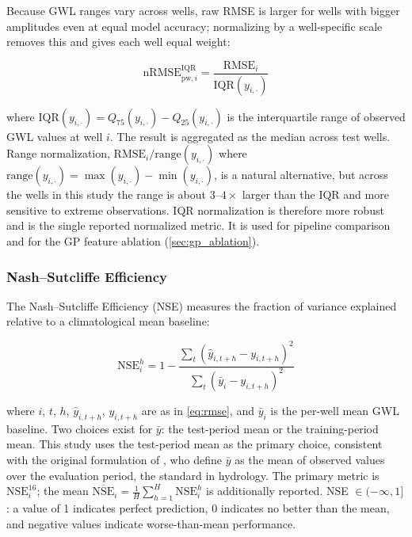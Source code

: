 Because GWL ranges vary across wells, raw RMSE is larger for wells with bigger amplitudes even at equal model accuracy; normalizing by a well-specific scale removes this and gives each well equal weight:

\begin{equation}
  \text{nRMSE}^\text{IQR}_{\text{pw},i} = \frac{\text{RMSE}_i}{\text{IQR}(y_{i,\cdot})}
  \label{eq:nrmse_iqr}
\end{equation}

where $\text{IQR}(y_{i,\cdot}) = Q_{75}(y_{i,\cdot}) - Q_{25}(y_{i,\cdot})$ is the interquartile range of observed GWL values at well $i$. The result is aggregated as the median across test wells. Range normalization, $\text{RMSE}_i / \text{range}(y_{i,\cdot})$ where $\text{range}(y_{i,\cdot}) = \max(y_{i,\cdot}) - \min(y_{i,\cdot})$, is a natural alternative, but across the wells in this study the range is about $3$--$4\times$ larger than the IQR and more sensitive to extreme observations. IQR normalization is therefore more robust and is the single reported normalized metric. It is used for pipeline comparison and for the GP feature ablation (\cref{sec:gp_ablation}).

\subsubsection{Nash--Sutcliffe Efficiency}

The Nash--Sutcliffe Efficiency (NSE) \citep{nash1970river} measures the fraction of variance
explained relative to a climatological mean baseline:

\begin{equation}
  \text{NSE}_i^h = 1 - \frac{\sum_t (\hat{y}_{i,t+h} - y_{i,t+h})^2}{\sum_t (\bar{y}_i - y_{i,t+h})^2}
  \label{eq:nse}
\end{equation}

where $i$, $t$, $h$, $\hat{y}_{i,t+h}$, $y_{i,t+h}$ are as in \cref{eq:rmse}, and $\bar{y}_i$ is the per-well mean GWL baseline. Two choices exist
for $\bar{y}$: the test-period mean or the training-period mean.
This study uses the test-period mean as the primary choice, consistent with the original
formulation of \citet{nash1970river}, who define $\bar{y}$ as the mean of observed values
over the evaluation period, the standard in hydrology.
The primary metric is $\text{NSE}_i^{16}$; the mean $\overline{\text{NSE}}_i = \frac{1}{H}\sum_{h=1}^{H} \text{NSE}_i^h$ is additionally reported. NSE $\in (-\infty, 1]$: a value of 1 indicates perfect prediction, 0 indicates no better than the mean, and negative values indicate worse-than-mean performance.

